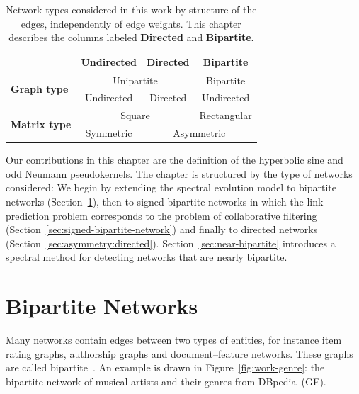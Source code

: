 \documentclass[11pt,a4paper]{book}
\begin{document}
\begin{table}[h!]
  \caption{
    Network types considered in this work by structure of the edges,
    independently of edge weights.
    This chapter describes the columns labeled \textbf{Directed} and
    \textbf{Bipartite}.   
  }
  \centering
  \begin{tabular}{  l | c | c | c | }
    \cline{2-4}
    & \textbf{Undirected} & \textbf{Directed} & \textbf{Bipartite} \\
    \hline
    \multicolumn{1}{|l|}{\multirow{2}{*}{\textbf{Graph type}}} & \multicolumn{2}{c|}{Unipartite} & Bipartite \\
    \cline{2-4}
    \multicolumn{1}{|l|}{}& Undirected & Directed & Undirected \\
    \hline
    \multicolumn{1}{|l|}{\multirow{2}{*}{\textbf{Matrix type}}} & \multicolumn{2}{c|}{Square} & Rectangular \\
    \cline{2-4}
    \multicolumn{1}{|l|}{}& Symmetric & \multicolumn{2}{c|}{Asymmetric} \\
    \hline
  \end{tabular}
  \label{tab:asymmetry}
\end{table}

Our contributions in this chapter are the definition of the hyperbolic
sine and odd Neumann pseudokernels. 
The chapter is structured by the type of networks considered:  
We begin by extending the spectral evolution model to
bipartite networks (Section~\ref{sec:bipartite:bipartite}), then to signed
bipartite networks in which the link prediction problem corresponds to
the problem of collaborative filtering
(Section~\ref{sec:signed-bipartite-network}) and finally to directed networks
(Section~\ref{sec:asymmetry:directed}). 
Section~\ref{sec:near-bipartite} introduces a spectral method for
detecting networks that are nearly bipartite. 

\section{Bipartite Networks}
\label{sec:bipartite:bipartite}
Many networks contain edges between two types of entities, for instance
item rating graphs, authorship graphs and document--feature networks.
These graphs are called bipartite~\cite{b531,b612}. 
An example is drawn in Figure~\ref{fig:work-genre}:  the bipartite
network of musical artists and 
their genres from DBpedia~(\textsf{GE}). 
\end{document}
